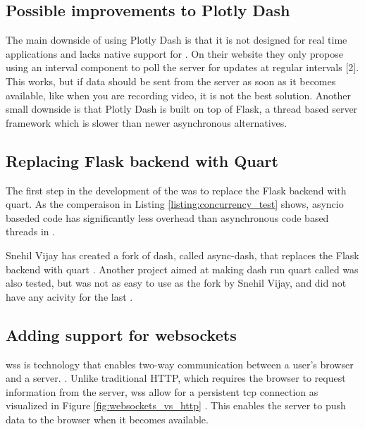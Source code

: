 \subsection{Possible improvements to Plotly Dash}
The main downside of using Plotly Dash is that it is not designed for real time
applications and lacks native support for . On their website they only propose
using an interval component to poll the server for updates at regular intervals
    [2]. This works, but if data should be sent from the server as soon as it becomes
available, like when you are recording video, it is not the best solution.
Another small downside is that Plotly Dash is built on top of Flask, a thread
based server framework which is slower than newer asynchronous alternatives.

\subsection{Replacing Flask backend with Quart}
The first step in the development of the \guif was to replace the Flask backend with \gls{quart}.
As the comperaison in Listing \ref{listing:concurrency_test} shows, \gls{asyncio} baseded code has significantly less overhead than asynchronous code based threads in \py.


Snehil Vijay has created a fork of \gls{dash}, called \gls{async-dash}, that replaces the Flask backend with \gls{quart} \cite{vijaySnehilvjAsyncdash2023}.
Another project aimed at making \gls{dash} run \gls{quart} called  was also tested, but was not as easy to use as the fork by Snehil Vijay, and did not have any acivity for the last  \cite{legrandCodeFrequencyRichlegrand}.


\subsection{Adding support for websockets}
\glspl{ws} is technology that enables two-way communication between a user's browser and a server.
\cite{farhutsWebSocketsBeginnersPart2019}.
Unlike traditional HTTP, which requires the browser to request information from the server, \glspl{ws} allow for a persistent \gls{tcp} connection as visualized in Figure \ref{fig:websockets_vs_http} \cite{tingUnderstandingWebSocketsIts2020}.
This enables the server to push data to the browser when it becomes available.

